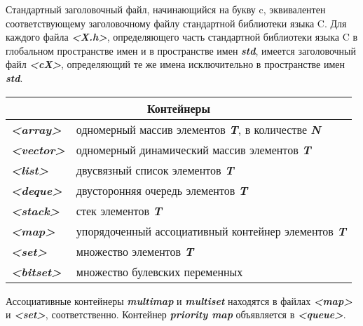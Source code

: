 \documentclass[a4paper, 12pt]{extarticle} %
\begin{document}
Стандартный заголовочный файл, начинающийся на букву c, эквивалентен соответствующему заголовочному файлу стандартной библиотеки языка C. Для каждого файла \textbf{\textit{<X.h>}}, определяющего часть стандартной библиотеки языка C в глобальном пространстве имен и в пространстве имен \textbf{\textit{std}}, имеется заголовочный файл \textbf{\textit{<cX>}}, определяющий те же имена исключительно в пространстве имен \textbf{\textit{std}}.
\begin{center}
    \begin{tabular}{ | l | l | }
        \hline
        \multicolumn{2}{|c|}{Контейнеры}                                                                               \\ \hline
        \textbf{\textit{<array>}}  & одномерный массив элементов \textbf{\textit{T}}, в количестве \textbf{\textit{N}} \\ \hline
        \textbf{\textit{<vector>}} & одномерный динамический массив элементов \textbf{\textit{T}}                      \\ \hline
        \textbf{\textit{<list>}}   & двусвязный список элементов \textbf{\textit{T}}                                   \\ \hline
        \textbf{\textit{<deque>}}  & двусторонняя очередь элементов \textbf{\textit{T}}                                \\ \hline
        \textbf{\textit{<stack>}}  & стек элементов \textbf{\textit{T}}                                                \\ \hline
        \textbf{\textit{<map>}}    & упорядоченный ассоциативный контейнер элементов \textbf{\textit{T}}               \\ \hline
        \textbf{\textit{<set>}}    & множество элементов \textbf{\textit{T}}                                           \\ \hline
        \textbf{\textit{<bitset>}} & множество булевских переменных                                                    \\ \hline
    \end{tabular}
\end{center}

Ассоциативные контейнеры \textbf{\textit{multimap}} и \textbf{\textit{multiset}} находятся в файлах \textbf{\textit{<map>}} и \textbf{\textit{<set>}}, соответственно. Контейнер \textbf{\textit{priority map}} объявляется в \textbf{\textit{<queue>}}.

\clearpage


\clearpage
\end{document}
